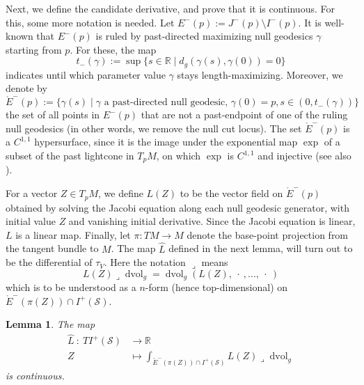 \documentclass[a4paper,11pt]{amsart}
\newtheorem{lemma}[theorem]{{Lemma}}%
\newcommand{\R}{\mathbb{R}}
\newcommand{\vol}{\operatorname{dvol}_g}
\newcommand{\CS}{\mathcal{S}}
\begin{document}
Next, we define the candidate derivative, and prove that it is continuous. For this, some more notation is needed. Let $E^-(p) := J^-(p) \setminus I^-(p)$. It is well-known that $E^-(p)$ is ruled by past-directed maximizing null geodesics $\gamma$ starting from $p$. For these, the map
\begin{equation*}
    t_-(\gamma) := \sup \{ s \in \R \mid d_g(\gamma(s),\gamma(0)) = 0  \} 
\end{equation*}
indicates until which parameter value $\gamma$ stays length-maximizing. Moreover, we denote by
\begin{equation*}
    \mathring E^-(p) := \{ \gamma(s) \mid \gamma \text{ a past-directed null geodesic, } \gamma(0) = p, s \in (0,t_-(\gamma)) \}
\end{equation*}
the set of all points in $E^-(p)$ that are not a past-endpoint of one of the ruling null geodesics (in other words, we remove the null cut locus). The set $\mathring E^-(p)$ is a $C^{1,1}$ hypersurface, since it is the image under the exponential map $\exp$ of a subset of the past lightcone in $T_pM$, on which $\exp$ is $C^{1,1}$ and injective (see also \cite[p.~2804]{CGM16}).

For a vector $Z \in T_pM$, we define $L(Z)$ to be the vector field on $\mathring E^-(p)$ obtained by solving the Jacobi equation along each null geodesic generator, with initial value $Z$ and vanishing initial derivative. Since the Jacobi equation is linear, $L$ is a linear map. Finally, let $\pi \colon TM \to M$ denote the base-point projection from the tangent bundle to $M$. The map $\hat L$ defined in the next lemma, will turn out to be the differential of $\tau_V$. Here the notation $\lrcorner$ means
\begin{equation*}
    L(Z) \lrcorner \vol = \vol(L(Z), \ \cdot\ ,...,\ \cdot\ )
\end{equation*}
which is to be understood as a $n$-form (hence top-dimensional) on $\mathring E^-(\pi(Z)) \cap I^+(\CS)$.

\begin{lemma} \label{lem:Lcont}
    The map
    \begin{align*}
        \hat L \ \colon \ T I^+(\CS) &\longrightarrow \R \\
        Z &\longmapsto \int_{\mathring E^-(\pi(Z)) \cap I^+(\CS)} L(Z) \lrcorner \vol
    \end{align*}
    is continuous.
\end{lemma}
\end{document}
